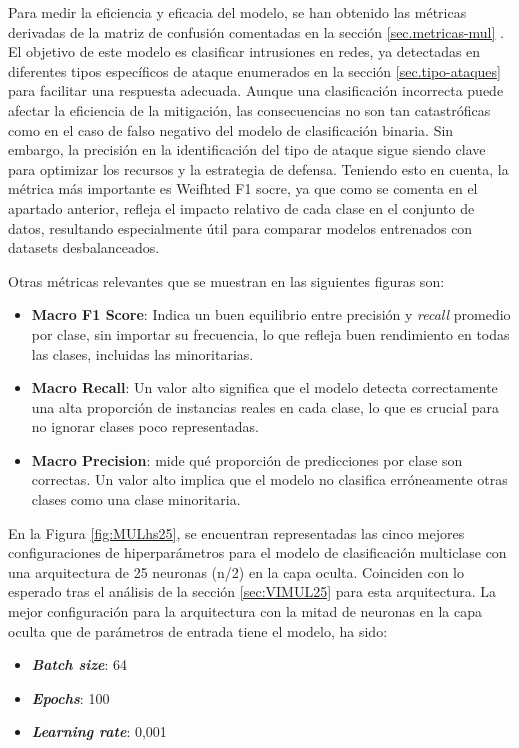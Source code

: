 Para medir la eficiencia y eficacia del modelo, se han obtenido las métricas derivadas de la matriz de confusión comentadas en la sección \ref{sec.metricas-mul} . El objetivo de este modelo es clasificar intrusiones en redes, ya detectadas en diferentes tipos específicos de ataque enumerados en la sección \ref{sec.tipo-ataques} para facilitar una respuesta adecuada. Aunque una clasificación incorrecta puede afectar la eficiencia de la mitigación, las consecuencias no son tan catastróficas como en el caso de falso negativo del modelo de clasificación binaria. Sin embargo, la precisión en la identificación del tipo de ataque sigue siendo clave para optimizar los recursos y la estrategia de defensa.
Teniendo esto en cuenta, la métrica más importante es Weifhted F1 socre, ya que como se comenta en el apartado anterior, refleja el impacto relativo de cada clase en el conjunto de datos, resultando especialmente útil para comparar modelos entrenados con datasets desbalanceados.

Otras métricas relevantes que se muestran en las siguientes figuras son:
\begin{itemize}
	\item \textbf{ Macro F1 Score}: Indica un buen equilibrio entre precisión y \textit{recall} promedio por clase, sin importar su frecuencia, lo que refleja buen rendimiento en todas las clases, incluidas las minoritarias.
	\item \textbf{ Macro Recall}: Un valor alto significa que el modelo detecta correctamente una alta proporción de instancias reales en cada clase, lo que es crucial para no ignorar clases poco representadas.
	\item \textbf{Macro Precision}: mide qué proporción de predicciones por clase son correctas. Un valor alto implica que el modelo no clasifica erróneamente otras clases como una clase minoritaria.
\end{itemize}

En la Figura \ref{fig:MULhs25}, se encuentran representadas las cinco mejores configuraciones de hiperparámetros para el modelo de clasificación multiclase con una arquitectura de 25 neuronas (n/2) en la capa oculta. Coinciden con lo esperado tras el análisis de la sección \ref{sec:VIMUL25} para esta arquitectura. La mejor configuración para la arquitectura con la mitad de neuronas en la capa oculta que de parámetros de entrada tiene el modelo, ha sido:
\begin{itemize}
	\item \textbf{\textit{Batch size}}: 64
	\item \textbf{\textit{Epochs}}: 100
	\item \textbf{\textit{Learning rate}}: 0,001
\end{itemize}

